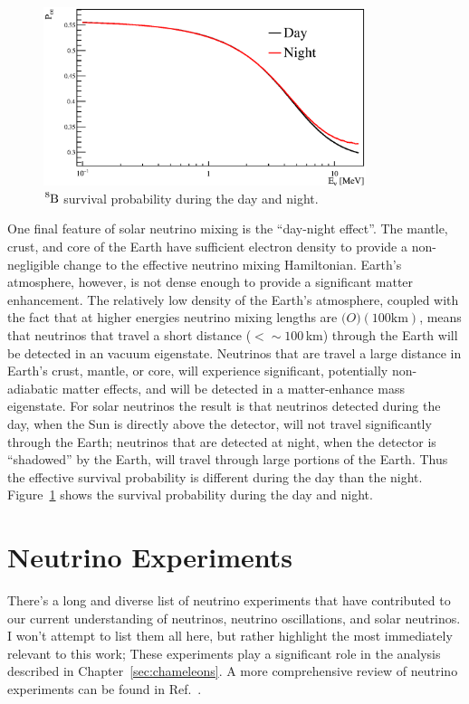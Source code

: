 \begin{figure}[htbp]
\centering
\includegraphics[width=0.84\textwidth]{day_night_example}
    \caption[Day and Night Survival Probability]{$\ce{^{8}B}$ survival
    probability during the day and night.}
\label{fig:day_night_example}
\end{figure}

One final feature of solar neutrino mixing is the ``day-night effect''.
The mantle, crust, and core of the Earth have sufficient electron density to provide
a non-negligible change to the effective neutrino mixing Hamiltonian.
Earth's atmosphere, however, is not dense enough to provide a significant
matter enhancement.
The relatively low density of the Earth's atmosphere, coupled with the fact that at higher energies neutrino mixing lengths
are $\mathcal(O)(100\mathrm{ km})$, means that neutrinos that travel a short
distance ($<\sim100$\,km) through the Earth will be detected in an
vacuum eigenstate.
Neutrinos that are travel a large distance in Earth's crust, mantle, or core,
will experience significant, potentially non-adiabatic matter effects, and will
be detected in a matter-enhance mass eigenstate.
For solar neutrinos the result is that neutrinos detected during the day, when
the Sun is directly above the detector, will not travel significantly through
the Earth;
neutrinos that are detected at night, when the detector is ``shadowed'' by the
Earth, will travel through large portions of the Earth.
Thus the effective survival probability is different during the day than the night.
Figure~\ref{fig:day_night_example} shows the survival probability during
the day and night.

\section{Neutrino Experiments}
\label{sec:experiments}
There's a long and diverse list of neutrino experiments that have contributed to
our current understanding of neutrinos, neutrino oscillations, and solar neutrinos.
I won't attempt to list them all here, but rather highlight the most immediately
relevant to this work;
These experiments play a significant role in the analysis described in Chapter~\ref{sec:chameleons}.
A more comprehensive review of neutrino experiments can be found in Ref.~\citep{giuntikim}.

